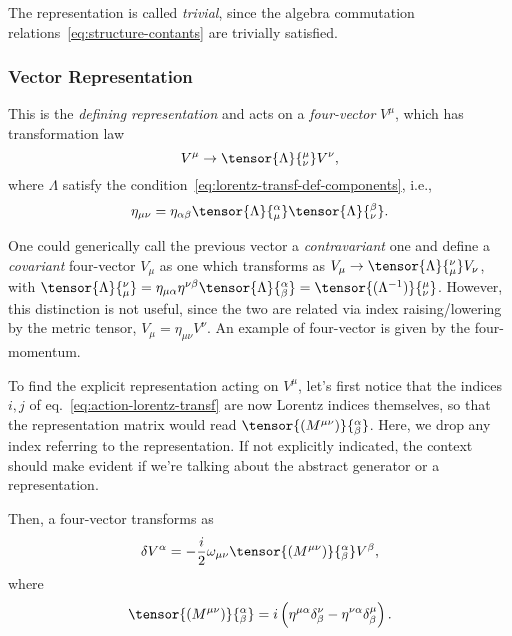The representation is called \emph{trivial}, since the algebra commutation relations~\eqref{eq:structure-contants} are trivially satisfied.

\subsubsection{Vector Representation}
This is the \emph{defining representation} and acts on a \emph{four-vector} $V^\mu$, which has transformation law
\begin{equation}\label{eq:lorentz-transf-four-vector}
    V^\mu \to \tensor{\Lambda}{^\mu_\nu} V^\nu,
\end{equation}
where $\Lambda$ satisfy the condition~\eqref{eq:lorentz-transf-def-components}, i.e.,
\begin{equation*}
    \eta_{\mu\nu} = \eta_{\alpha\beta} \tensor{\Lambda}{^\alpha_\mu} \tensor{\Lambda}{^\beta_\nu}.
\end{equation*}

One could generically call the previous vector a \emph{contravariant} one and define a \emph{covariant} four-vector $V_\mu$ as one which transforms as $V_\mu \to \tensor{\Lambda}{_\mu^\nu} V_\nu$, with $\tensor{\Lambda}{_\mu^\nu} = \eta_{\mu\alpha} \eta^{\nu\beta} \tensor{\Lambda}{^\alpha_\beta} = \tensor{(\Lambda^{-1})}{^\mu_\nu}$. However, this distinction is not useful, since the two are related via index raising/lowering by the metric tensor, $V_\mu = \eta_{\mu\nu} V^\nu$. An example of four-vector is given by the four-momentum.

To find the explicit representation acting on $V^\mu$, let's first notice that the indices $i,j$ of eq.~\eqref{eq:action-lorentz-transf} are now Lorentz indices themselves, so that the representation matrix would read $\tensor{(M^{\mu\nu})}{^\alpha_\beta}$. Here, we drop any index referring to the representation. If not explicitly indicated, the context should make evident if we're talking about the abstract generator or a representation. 

Then, a four-vector transforms as
\begin{equation}\label{eq:variation-lorentz-transf-four-vector}
   \delta V^\alpha = - \frac{i}{2} \omega_{\mu\nu} \tensor{(M^{\mu\nu})}{^\alpha_\beta} V^\beta ,
\end{equation}
where
\begin{equation}\label{eq:lorentz-transf-matrix-vector-rep}
    \tensor{(M^{\mu\nu})}{^\alpha_\beta} = i \left( \eta^{\mu\alpha} \delta^\nu_\beta - \eta^{\nu\alpha} \delta^\mu_\beta \right) .
\end{equation}

